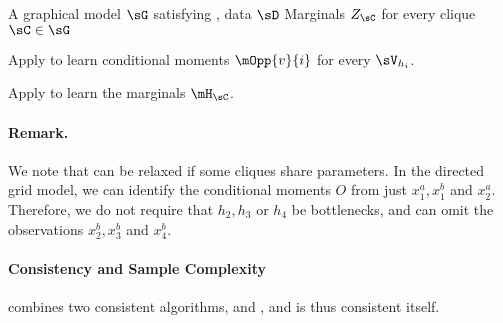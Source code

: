 \renewcommand{\algorithmicrequire}{\textbf{Input:}}
\renewcommand{\algorithmicensure}{\textbf{Output:}}
\begin{algorithm}
  \caption{\LearnMarginals}
  \label{algo:directed}
  \begin{algorithmic}
    \REQUIRE A graphical model $\sG$ satisfying , data $\sD$
    \ENSURE Marginals $Z_\sC$ for every clique $\sC \in \sG$

        \STATE Apply \TensorFactorize to learn conditional moments
        $\mOpp{v}{i}$ for every $\sV_{h_i}$.

      \ENDFOR
  \STATE Apply \LearnClique to learn the marginals $\mH_\sC$.
\ENDFOR
  \end{algorithmic}
\end{algorithm}

\paragraph{Remark.} We note that  can be relaxed if some cliques
  share parameters.
In the directed grid model, we can identify the conditional moments $O$ from just
  $x^a_1, x^b_1$ and $x^a_2$.
  Therefore, we do not require that $h_2, h_3$ or $h_4$
  be bottlenecks, and can omit the observations $x^b_2, x^b_3$ and $x^b_4$.

\paragraph{Consistency and Sample Complexity}

\LearnMarginals combines two consistent algorithms, \TensorFactorize and
\LearnCliqueNs, and is thus consistent itself.


